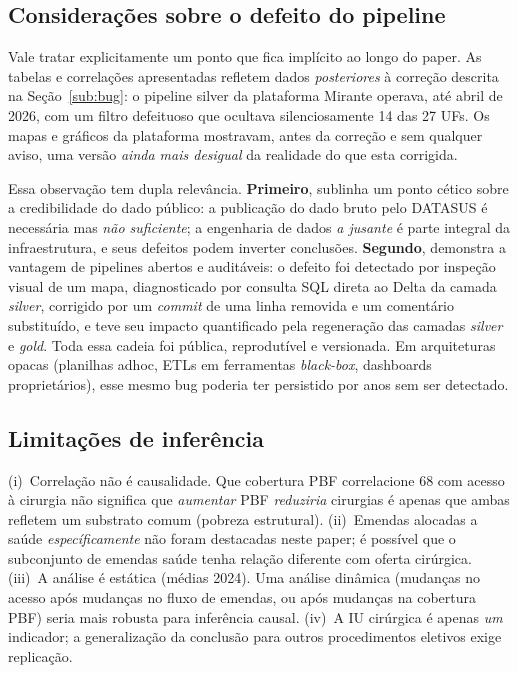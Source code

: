 \documentclass[12pt,a4paper,oneside]{article}
\begin{document}
\subsection{Considerações sobre o defeito do pipeline}

Vale tratar explicitamente um ponto que fica implícito ao longo
do paper. As tabelas e correlações apresentadas refletem dados
\textit{posteriores} à correção descrita na
Seção~\ref{sub:bug}: o pipeline silver da plataforma Mirante
operava, até abril de 2026, com um filtro defeituoso que
ocultava silenciosamente 14 das 27 UFs. Os mapas e gráficos da
plataforma mostravam, antes da correção e sem qualquer aviso,
uma versão \textit{ainda mais desigual} da realidade do que
esta corrigida.

Essa observação tem dupla relevância. \textbf{Primeiro}, sublinha
um ponto cético sobre a credibilidade do dado público: a
publicação do dado bruto pelo DATASUS é necessária mas \textit{não
suficiente}; a engenharia de dados \textit{a jusante} é parte
integral da infraestrutura, e seus defeitos podem inverter
conclusões. \textbf{Segundo}, demonstra a vantagem de pipelines
abertos e auditáveis: o defeito foi detectado por inspeção visual
de um mapa, diagnosticado por consulta SQL direta ao Delta da
camada \textit{silver}, corrigido por um \textit{commit} de uma
linha removida e um comentário substituído, e teve seu impacto
quantificado pela regeneração das camadas \textit{silver} e
\textit{gold}. Toda essa cadeia foi pública, reprodutível e
versionada. Em arquiteturas opacas (planilhas adhoc, ETLs em
ferramentas \textit{black-box}, dashboards proprietários), esse
mesmo bug poderia ter persistido por anos sem ser detectado.

\subsection{Limitações de inferência}

(i)~Correlação não é causalidade. Que cobertura PBF correlacione
68 com acesso à cirurgia não significa que
\textit{aumentar} PBF \textit{reduziria} cirurgias \textemdash{}
é apenas que ambas refletem um substrato comum (pobreza
estrutural). (ii)~Emendas alocadas a saúde \textit{específicamente}
não foram destacadas neste paper; é possível que o subconjunto
de emendas saúde tenha relação diferente com oferta cirúrgica.
(iii)~A análise é estática (médias 2024). Uma
análise dinâmica (mudanças no acesso após mudanças no fluxo de
emendas, ou após mudanças na cobertura PBF) seria mais robusta
para inferência causal. (iv)~A IU cirúrgica é apenas \textit{um}
indicador; a generalização da conclusão para outros
procedimentos eletivos exige replicação.
\end{document}
